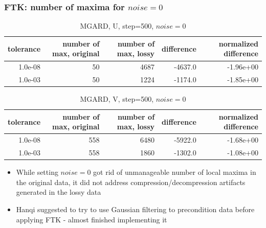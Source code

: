 \begin{frame}[fragile]
{ 



  }

  
\end{frame}


\begin{frame}[fragile]
  \frametitle{FTK: number of maxima for $noise = 0$ }

  {\tiny

 \begin{table}[H]
\centering
\begin{tabular}{|r|r|r|r|r|}
\hline
tolerance &  number of max, original &  number of max, lossy &  difference & normalized difference \\
\hline 

  1.0e-08 &               50 &          4687 &         -4637.0 &      -1.96e+00 \\ \hline
  1.0e-03 &               50 &          1224 &         -1174.0 &      -1.85e+00 \\ \hline
\end{tabular}
\caption{MGARD, U, step=500, $noise=0$}
\label{mgard_u_n0}
\end{table}

\begin{table}[H]
\centering
\begin{tabular}{|r|r|r|r|r|}
\hline
tolerance &  number of max, original &  number of max, lossy &  difference & normalized difference \\
\hline 

  1.0e-08 &              558 &          6480 &         -5922.0 &      -1.68e+00 \\ \hline
  1.0e-03 &              558 &          1860 &         -1302.0 &      -1.08e+00 \\ \hline
\end{tabular}
\caption{MGARD, V, step=500, $noise=0$}
\label{mgard_v_n0}
\end{table}

  }


  \begin{itemize}
  \item While setting $noise = 0$ got rid of unmanageable number of local maxima in the original data, it did not address
    compression/decompression artifacts generated in the lossy data
  \item Hanqi suggested to try to use Gaussian filtering to precondition data before applying FTK - almost finished implementing it
  \end{itemize}
  
\end{frame}
